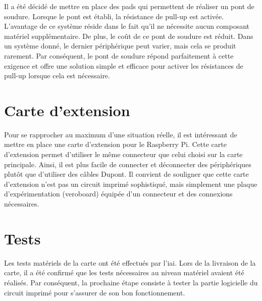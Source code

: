 Il a été décidé de mettre en place des pads qui permettent de réaliser un pont de soudure.
Lorsque le pont est établi, la résistance de pull-up est activée.
L'avantage de ce système réside dans le fait qu'il ne nécessite aucun composant matériel supplémentaire.
De plus, le coût de ce pont de soudure est réduit.
Dans un système donné, le dernier périphérique peut varier, mais cela se produit rarement.
Par conséquent, le pont de soudure répond parfaitement à cette exigence et offre une solution simple et efficace pour activer les résistances de pull-up lorsque cela est nécessaire.


\section{Carte d'extension}

Pour se rapprocher au maximum d'une situation réelle, il est intéressant de mettre en place une carte d'extension pour le Raspberry Pi.
Cette carte d'extension permet d'utiliser le même connecteur que celui choisi sur la carte principale.
Ainsi, il est plus facile de connecter et déconnecter des périphériques plutôt que d'utiliser des câbles Dupont.
Il convient de souligner que cette carte d'extension n'est pas un circuit imprimé sophistiqué, mais simplement une plaque d'expérimentation (veroboard) équipée d'un connecteur et des connexions nécessaires.

\section{Tests}

Les tests matériels de la carte ont été effectués par l'\gls{iai}.
Lors de la livraison de la carte, il a été confirmé que les tests nécessaires au niveau matériel avaient été réalisés.
Par conséquent, la prochaine étape consiste à tester la partie logicielle du circuit imprimé pour s'assurer de son bon fonctionnement.

